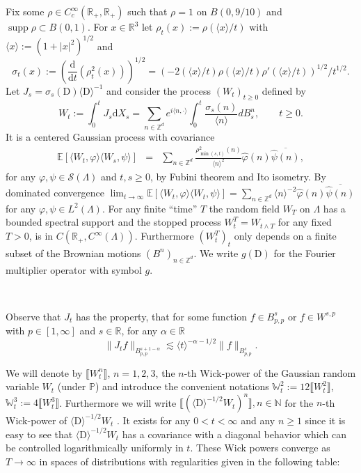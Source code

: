 \documentclass[11pt]{article}
\newcommand{\assign}{:=}
\newcommand{\mathD}{\mathrm{D}}
\newcommand{\mathd}{\mathrm{d}}
\newcommand{\nocomma}{}
\newcommand{\tmop}[1]{\ensuremath{\operatorname{#1}}}
\newcommand{\CS}{\mathscr{S}}
\begin{document}
Fix some $\rho \in C_c^{\infty} (\mathbb{R}_+, \mathbb{R}_+)$ such that $\rho
= 1$ on $B (0, 9 / 10)$ and $\tmop{supp} \rho \subset B (0, 1)$. For $x \in
\mathbb{R}^3$ let $\rho_t (x) \assign \rho (\langle x \rangle / t)$ with
$\langle x \rangle \assign (1 + | x |^2)^{1 / 2}$ and
\[ \sigma_t (x) \assign \left( \frac{\mathd}{\mathd t} (\rho^2_t (x))
   \right)^{1 / 2} = (- 2 (\langle x \rangle / t) \rho (\langle x \rangle / t)
   \rho' (\langle x \rangle / t))^{1 / 2} / t^{1 / 2} . \]
Let $J_s = \sigma_s (\mathD) \langle \mathD \rangle^{- 1}$ and consider the
process $(W_t)_{t \geqslant 0}$ defined by
\begin{equation}
  W_t \assign \int_0^t J_s \mathd X_s = \sum_{n \in \mathbb{Z}^d} e^{i \langle
  n, \cdot \rangle} \int_0^t \frac{\sigma_s (n)}{\langle n \rangle} d B^n_s,
  \qquad t \geqslant 0. \label{eq:def-Y}
\end{equation}
It is a centered Gaussian process with covariance
\begin{eqnarray*}
  \mathbb{E} [\langle W_t, \varphi \rangle \langle W_s, \psi \rangle] & = &
  \sum_{n \in \mathbb{Z}^d} \frac{\rho_{\min (s, t)}^2 (n)}{\langle n
  \rangle^2} \hat{\varphi} (n) \overline{\hat{\psi} (n)},
\end{eqnarray*}
for any $\varphi, \psi \in \CS (\Lambda)$ and $t, s \geqslant 0$, by Fubini
theorem and Ito isometry. By dominated convergence $\lim_{t \rightarrow
\infty} \mathbb{E} [\langle W_t, \varphi \rangle \langle W_t, \psi \rangle] =
\sum_{n \in \mathbb{Z}^d} \langle n \rangle^{- 2} \hat{\varphi} (n)
\overline{\hat{\psi} (n)}$ for any $\varphi \nocomma, \psi \in L^2 (\Lambda)$.
For any finite ``time'' $T$ the random field $W_T$ on $\Lambda$ has a bounded
spectral support and the stopped process $W^T_t = W_{t \wedge T}$ for any
fixed $T > 0$, is in $C (\mathbb{R}_+, C^{\infty} (\Lambda))$. Furthermore
$(W^T_t)_t$ only depends on a finite subset of the Brownian motions $(B^n)_{n
\in \mathbb{Z}^d}$. We write $g (\mathD)$ for the Fourier multiplier operator
with symbol $g$.

\

Observe that $J_t$ has the property, that for some function $f \in B_{p,
p}^s$ or $f \in W^{s, p}$ with $p \in [1, \infty]$ and $s \in \mathbb{R}$,
for any $\alpha \in \mathbb{R}$
\[ \| J_t f \|_{B_{p, p}^{s + 1 - \alpha}} \lesssim \langle t \rangle^{-
   \alpha - 1 / 2} \| f \|_{B_{p, p}^s} . \]


We will denote by $\llbracket W^n_t \rrbracket$, $n = 1, 2, 3$, the $n$-th
Wick-power of the Gaussian random variable $W_t$ (under $\mathbb{P}$) and
introduce the convenient notations $\mathbb{W}_t^2 \assign 12 \llbracket W^2_t
\rrbracket$, $\mathbb{W}_t^3 \assign 4 \llbracket W_t^3 \rrbracket$.
Furthermore we will write $\llbracket (\langle \mathD \rangle^{- 1 / 2} W_t)^n
\rrbracket, n \in \mathbb{N}$ for the $n$-th Wick-power of $\langle \mathD
\rangle^{- 1 / 2} W_t$ . It exists for any $0 < t < \infty$ and any $n
\geqslant 1$ since it is easy to see that $\langle \mathD \rangle^{- 1 / 2}
W_t$ has a covariance with a diagonal behavior which can be controlled
logarithmically uniformly in $t$. These Wick powers converge as $T \rightarrow
\infty$ in spaces of distributions with regularities given in the following
table:
\end{document}

